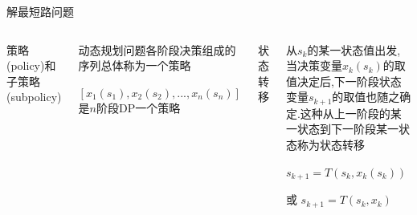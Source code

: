 \begin{frame}{解最短路问题}
\begin{columns}
            \begin{enumerate}[(4)]
                \scriptsize{\item 策略(policy)和子策略(subpolicy)}
            \end{enumerate}
            \begin{itemize}
                \scriptsize{\item 动态规划问题各阶段决策组成的序列总体称为一个策略}
                \item $[x_1(s_1),x_2(s_2),...,x_n(s_n)]$是$n$阶段DP一个策略
            \end{itemize}
            \pause
            \begin{enumerate}[(5)]
                \scriptsize{\item 状态转移}
            \end{enumerate}
            \begin{itemize}
                \scriptsize{\item 从$s_k$的某一状态值出发,当决策变量$x_k(s_k)$的取值决定后,下一阶段状态变量$s_{k+1}$的取值也随之确定.这种从上一阶段的某一状态到下一阶段某一状态称为状态转移}
                \item $s_{k+1}=T(s_k,x_k(s_k))$
                \item 或 $s_{k+1}=T(s_k,x_k)$
            \end{itemize}
    \end{columns}
\end{frame}
